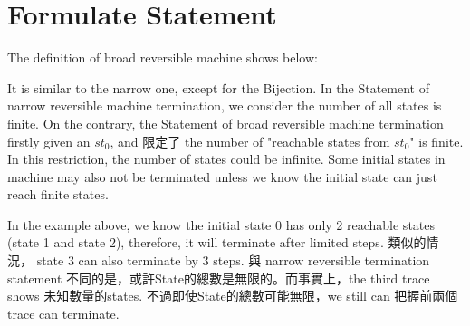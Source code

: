 \section{ Formulate Statement }
The definition of broad reversible machine shows below:



It is similar to the narrow one, except for the Bijection.
In the Statement of narrow reversible machine termination, we consider the number of all states is finite.
On the contrary, the Statement of broad reversible machine termination firstly given an $st_{0}$, and 限定了 the number of "reachable states from $st_{0}$" is finite.
In this restriction, the number of states could be infinite.  Some initial states in machine may also not be terminated unless we know the initial state can just reach finite states.



In the example above, we know the initial state 0 has only 2 reachable states (state 1 and state 2), therefore, it will terminate after limited steps.
類似的情況， state 3 can also terminate by 3 steps.
與 narrow reversible termination statement 不同的是，或許State的總數是無限的。而事實上，the third trace shows 未知數量的states. 
不過即使State的總數可能無限，we still can 把握前兩個trace can terminate.
